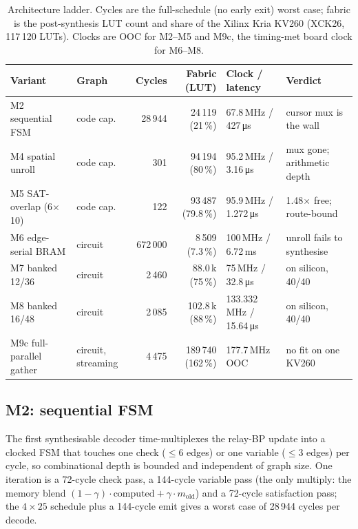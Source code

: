 \begin{table}[t]
\centering
\footnotesize
\caption{Architecture ladder. Cycles are the full-schedule (no early exit)
worst case; fabric is the post-synthesis LUT count and share of the Xilinx
Kria KV260 (XCK26, 117\,120 LUTs). Clocks are OOC for M2--M5 and M9c,
the timing-met board clock for M6--M8.}
\label{tab:ladder}
\begin{tabular}{@{}llrrll@{}}
\toprule
Variant & Graph & Cycles & Fabric (LUT) & Clock / latency & Verdict \\
\midrule
M2 sequential FSM & code cap. & 28\,944 & 24\,119 (21\,\%) & 67.8\,MHz / 427\,\si{\micro\second} & cursor mux is the wall \\
M4 spatial unroll & code cap. & 301 & 94\,194 (80\,\%) & 95.2\,MHz / 3.16\,\si{\micro\second} & mux gone; arithmetic depth \\
M5 SAT-overlap (6$\times$10) & code cap. & 122 & 93\,487 (79.8\,\%) & 95.9\,MHz / 1.272\,\si{\micro\second} & 1.48$\times$ free; route-bound \\
M6 edge-serial BRAM & circuit & 672\,000 & 8\,509 (7.3\,\%) & 100\,MHz / 6.72\,ms & unroll fails to synthesise \\
M7 banked 12/36 & circuit & 2\,460 & 88.0\,k (75\,\%) & 75\,MHz / 32.8\,\si{\micro\second} & on silicon, 40/40 \\
M8 banked 16/48 & circuit & 2\,085 & 102.8\,k (88\,\%) & 133.332\,MHz / 15.64\,\si{\micro\second} & on silicon, 40/40 \\
M9c full-parallel gather & circuit, streaming & 4\,475 & 189\,740 (162\,\%) & 177.7\,MHz OOC & no fit on one KV260 \\
\bottomrule
\end{tabular}
\end{table}

\subsection*{M2: sequential FSM}
The first synthesisable decoder time-multiplexes the relay-BP update into
a clocked FSM that touches one check ($\le 6$ edges) or one variable
($\le 3$ edges) per cycle, so combinational depth is bounded and independent
of graph size. One iteration is a 72-cycle check pass, a 144-cycle
variable pass (the only multiply: the memory blend
$(1-\gamma)\cdot\mathrm{computed}+\gamma\cdot m_{\mathrm{old}}$) and a
72-cycle satisfaction pass; the $4\times 25$ schedule plus a 144-cycle emit
gives a worst case of 28\,944 cycles per decode.

